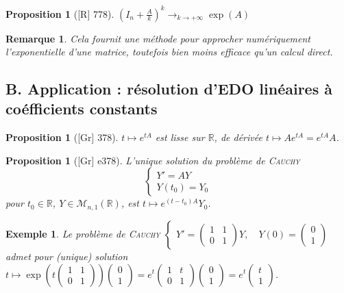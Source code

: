 \documentclass[10pt, a4paper, parskip=full, twoside, twocolumn]{report}
\newtheorem{proposition}[definition]{Proposition}
\newtheorem{example}[definition]{Exemple}
\newtheorem{remark}[definition]{Remarque}
\newcommand{\IR}{\mathbb{R}}
\newcommand{\M}{\mathcal{M}}
\begin{document}
\begin{proposition}[\textnormal{[R] 778}]
	$\left(I_n + \frac{A}{k}\right)^k \to_{k\to +\infty} \exp(A)$
\end{proposition}

\begin{remark}
	Cela fournit une méthode pour approcher numériquement l'exponentielle d'une matrice, toutefois bien moins efficace qu'un calcul direct.
\end{remark}

\subsection*{B. Application : résolution d'EDO linéaires à coéfficients constants}
\begin{proposition}[\textnormal{[Gr] 378}]
	$t\mapsto e^{tA}$ est lisse sur $\IR$, de dérivée $t\mapsto Ae^{tA} = e^{tA}A$.
\end{proposition}

\begin{proposition}[\textnormal{[Gr] e378}]
	L'unique solution du problème de \textsc{Cauchy}
	$$\begin{cases}
		Y' = AY \\ Y(t_0) = Y_0
	\end{cases}$$
	pour $t_0\in \IR$, $Y\in\M_{n,1}(\IR)$, est $t\mapsto e^{(t-t_0)A}Y_0$.
\end{proposition}

\begin{example}
	Le problème de \textsc{Cauchy}
	$\begin{cases}
		Y' = \begin{pmatrix}
			1&1\\0&1
		\end{pmatrix}Y,\quad Y(0) = \begin{pmatrix}
			0\\1
		\end{pmatrix}
	\end{cases}$
	admet pour (unique) solution $t\mapsto \exp\left(t\begin{pmatrix}
		1&1\\0&1
	\end{pmatrix}\right)\begin{pmatrix}
		0\\1
	\end{pmatrix} = e^t\begin{pmatrix}
		1&t\\0&1
	\end{pmatrix}\begin{pmatrix}
		0\\1
	\end{pmatrix} = e^t\begin{pmatrix}
		t\\1
	\end{pmatrix}$.
\end{example}
\end{document}
